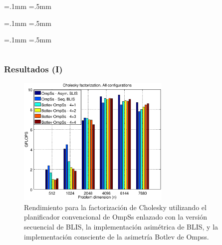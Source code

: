 \documentclass[10pt]{beamer}
\begin{document}
\begin{frame}
\begin{columns}[c]
\begin{column}{0.4\textwidth}
      \fboxsep=.1mm \fboxrule=.5mm

      \fboxsep=.1mm \fboxrule=.5mm

      \fboxsep=.1mm \fboxrule=.5mm

    \end{column}
  \end{columns}
\end{frame}


\begin{frame}
  \frametitle{Resultados (I)}
  \begin{figure}
    \centering
    \includegraphics[width=0.65\textwidth]{Plots/Comparative/comparative}
    \caption{Rendimiento para la factorización de Cholesky utilizando el
      planificador convencional de OmpSs enlazado con la versión secuencial
      de BLIS, la implementación asimétrica de BLIS, y la implementación
      consciente de la asimetría Botlev de Ompss.}
    \label{fig:comparative}
  \end{figure}
\end{frame}
\end{document}
